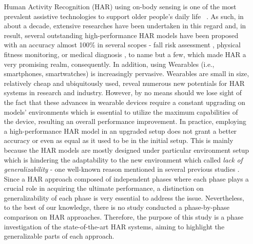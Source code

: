 \documentclass[journal,article,submit,moreauthors,pdftex]{Definitions/mdpi}
\begin{document}
Human Activity Recognition (HAR) using on-body sensing is one of the most prevalent assistive technologies to support older people's daily life ~\cite{wang2019survey}. As such, in about a decade, extensive researches have been undertaken in this regard and, in result, several outstanding high-performance HAR models have been proposed with an accuracy almost 100\% in several scopes - fall risk assessment \cite{sow2013mining}, physical fitness monitoring\cite{morris2014recofit}, or medical diagnosis \cite{gonzalez2015features}, to name but a few, which made HAR a very promising realm, consequently. In addition, using Wearables (i.e., smartphones, smartwatches) is increasingly pervasive. Wearables are small in size, relatively cheap and ubiquitously used, reveal numerous new potentials for HAR systems in research and industry. However, by no means should we lose sight of the fact that these advances in wearable devices require a constant upgrading on models' environments which is essential to utilize the maximum capabilities of the device, resulting an overall performance improvement. In practice, employing a high-performance HAR model in an upgraded setup does not grant a better accuracy or even as equal as it used to be in the initial setup. This is mainly because the HAR models are mostly designed under particular environment setup which is hindering the adaptability to the new environment which called \textit{lack of generalizability} - one well-known reason mentioned in several previous studies \cite{schilit1994context, soro2019recognition, shoaib2016complex}. Since a HAR approach composed of independent phases where each phase plays a crucial role in acquiring the ultimate performance, a distinction on generalizability of each phase is very essential to address the issue. Nevertheless, to the best of our knowledge, there is no study conducted a phase-by-phase comparison on HAR approaches. Therefore, the purpose of this study is a phase investigation of the state-of-the-art HAR systems, aiming to highlight the generalizable parts of each approach.\\
\end{document}
